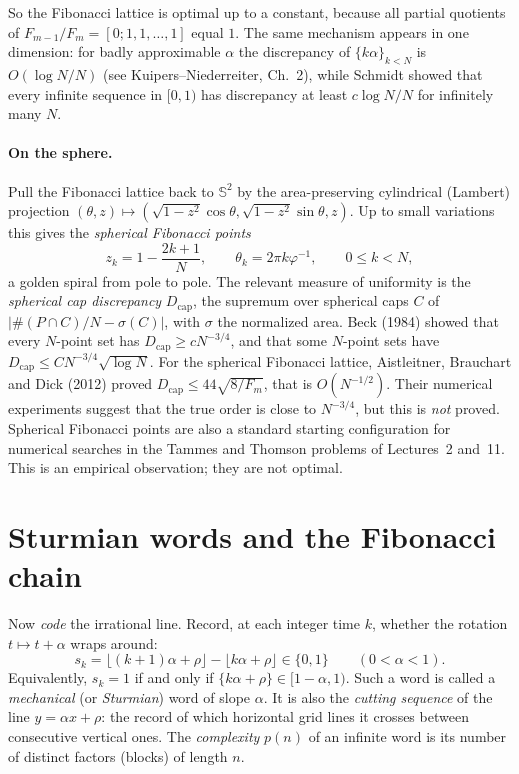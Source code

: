 \documentclass[11pt,openany]{book}
\theoremstyle{plain}
\theoremstyle{definition}
\theoremstyle{remark}
\newcommand{\Sph}{\mathbb{S}}          %
\newcommand{\abs}[1]{\left\lvert #1 \right\rvert}
\begin{document}
So the Fibonacci lattice is optimal up to a constant, because all partial quotients of
$F_{m-1}/F_m=[0;1,1,\dots,1]$ equal $1$. The same mechanism appears in one dimension: for badly
approximable $\alpha$ the discrepancy of $\{k\alpha\}_{k<N}$ is $O(\log N/N)$ (see Kuipers--Niederreiter,
Ch.~2), while Schmidt showed that every infinite sequence in $[0,1)$ has discrepancy at least $c\log N/N$ for infinitely many $N$.

\paragraph{On the sphere.} Pull the Fibonacci lattice back to $\Sph^2$ by the area-preserving
cylindrical (Lambert) projection $(\theta,z)\mapsto(\sqrt{1-z^2}\cos\theta,\sqrt{1-z^2}\sin\theta,z)$.
Up to small variations this gives the \emph{spherical Fibonacci points}
\begin{equation}\label{ERG:eq:sphfib}
  z_k=1-\frac{2k+1}{N},\qquad \theta_k=2\pi k\varphi^{-1},\qquad 0\le k<N,
\end{equation}
a golden spiral from pole to pole. The relevant measure of uniformity is the \emph{spherical cap
discrepancy} $D_{\mathrm{cap}}$, the supremum over spherical caps $C$ of $\abs{\#(P\cap C)/N-\sigma(C)}$,
with $\sigma$ the normalized area. Beck (1984) showed that every $N$-point set has
$D_{\mathrm{cap}}\ge cN^{-3/4}$, and that some $N$-point sets have $D_{\mathrm{cap}}\le C N^{-3/4}\sqrt{\log N}$.
For the spherical Fibonacci lattice, Aistleitner, Brauchart and Dick (2012) proved
$D_{\mathrm{cap}}\le 44\sqrt{8/F_m}$, that is $O(N^{-1/2})$. Their numerical experiments suggest
that the true order is close to $N^{-3/4}$, but this is \emph{not} proved. Spherical Fibonacci points
are also a standard starting configuration for numerical searches in the Tammes and Thomson problems
of Lectures~2 and~11. This is an empirical observation; they are not optimal.

\section{Sturmian words and the Fibonacci chain}
\label{ERG:sec:sturm}

Now \emph{code} the irrational line. Record, at each integer time $k$, whether the rotation
$t\mapsto t+\alpha$ wraps around:
\[
  s_k=\lfloor(k+1)\alpha+\rho\rfloor-\lfloor k\alpha+\rho\rfloor\in\{0,1\}\qquad(0<\alpha<1).
\]
Equivalently, $s_k=1$ if and only if $\{k\alpha+\rho\}\in[1-\alpha,1)$. Such a word is called a
\emph{mechanical} (or \emph{Sturmian}) word of slope $\alpha$. It is also the \emph{cutting sequence} of
the line $y=\alpha x+\rho$: the record of which horizontal grid lines it crosses between consecutive
vertical ones. The \emph{complexity} $p(n)$ of an infinite word is its number of distinct factors (blocks)
of length $n$.
\end{document}

